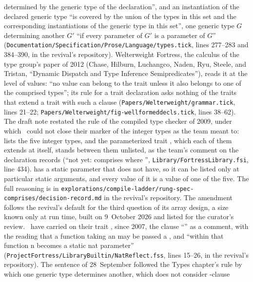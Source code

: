 \begin{description}
determined by the generic type of the declaration'', and an instantiation of
the declared generic type ``is covered by the union of the types in this set
and the corresponding instantiations of the generic type in this set'', one
generic type $G$ determining another $G'$ ``if every parameter of $G'$ is a
parameter of $G$''
(\nolinkurl{Documentation/Specification/Prose/Language/types.tick}, lines
277--283 and 384--390, in the revival's repository).
Welterweight Fortress, the calculus of the type group's paper of 2012
(Chase, Hilburn, Luchangco, Naden, Ryu, Steele, and Tristan, ``Dynamic
Dispatch and Type Inference Semipredicates''), reads it at the level of
values: ``no value can belong to the trait unless it also belongs to one of
the comprised types''; its rule for a trait declaration asks nothing of the
traits that extend a trait with such a clause
(\nolinkurl{Papers/Welterweight/grammar.tick}, lines 21--22;
\nolinkurl{Papers/Welterweight/fig-wellformeddecls.tick}, lines 38--62).
The draft note restated the rule of the compiled type checker of 2009,
under which \library\ could not close their marker of the integer types as
the team meant to:  lists the five integer types, and the
parameterized trait , which each
of them extends at itself, stands between them unlisted, as the team's
comment on the declaration records (``not yet: comprises
 where
'', \nolinkurl{Library/FortressLibrary.fsi},
line 434).
 has a static parameter that  does not have,
so it can be listed only at particular static arguments, and every value of it is a value of one of the five.
The full reasoning is in
\nolinkurl{explorations/compile-ladder/rung-spec-comprises/decision-record.md}
in the revival's repository.
The amendment follows the revival's default for the third question of its
array design, a size known only at run time, built on 9~October 2026 and
listed for the curator's review.
\library\ have carried on their trait , since 2007, the clause
``''
as a comment, with the reading that a function taking an
 may be passed a , and ``within
that function n becomes a static nat parameter''
(\nolinkurl{ProjectFortress/LibraryBuiltin/NatReflect.fss}, lines 15--26, in
the revival's repository).
The sentence of 28~September followed the Types chapter's rule by which one
generic type determines another, which does not consider -clause

\end{description}
